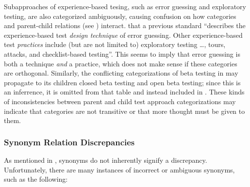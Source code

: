Subapproaches of experience-based tesing, such as error guessing and
exploratory testing, are also categorized ambiguously, causing confusion on how
categories and parent-child relations (see ) interact.
 \citet[p.~34\ifnotpaper, emphasis added\fi]{IEEE2022}
 that a previous standard \citeyearpar{IEEE2021}
``describes the experience-based test \emph{design technique} of error
guessing. Other experience-based test \emph{practices} include (but are not
limited to) exploratory testing \dots, tours, attacks, and checklist-based
testing''. This seems to imply that error guessing is both a technique
\emph{and} a practice, which does not make sense if these categories are
orthogonal. \ifnotpaper Similarly, the conflicting categorizations of beta
    testing in  may propagate to its children closed beta
    testing and open beta testing; since this is an inferrence, it is omitted
    from that table and instead included in . \fi These
kinds of inconsistencies between parent and child test approach categorizations
may indicate that categories are not transitive or that more thought must be
given to them.

\ifnotpaper
    \begin{bigLandscape}
        
    \end{bigLandscape}
\else %
\fi

\subsubsection{Synonym Relation Discrepancies}
\label{syns}

As mentioned in , synonyms do not inherently signify a
discrepancy. Unfortunately, there are many instances of incorrect or ambiguous
synonyms, such as the following:



